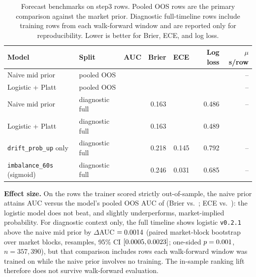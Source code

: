 \begin{table}[t]
  \centering
  \caption{Forecast benchmarks on step3 rows. Pooled OOS rows are the primary
    comparison against the market prior. Diagnostic full-timeline rows include
    training rows from each walk-forward window and are reported only for
    reproducibility. Lower is better for Brier, ECE, and log loss.}
  \label{tab:forecast-benchmarks}
  \footnotesize
  \setlength{\tabcolsep}{3pt}
  \begin{tabular}{@{}llrrrrr@{}}
    \toprule
    Model & Split & AUC & Brier & ECE & Log loss & $\mu$s/row \\
    \midrule
    Naive mid prior & pooled OOS & \OpenMarketNaiveOosAuc{} & \OpenMarketNaiveOosBrier{} & \OpenMarketNaiveOosEce{} & \OpenMarketNaiveOosLogLoss{} & -- \\
    Logistic + Platt & pooled OOS & \OpenMarketModelOosAuc{} & \OpenMarketModelOosBrier{} & \OpenMarketModelOosEce{} & \OpenMarketModelOosLogLoss{} & -- \\
    Naive mid prior & diagnostic full & \OpenMarketNaiveAuc{} & 0.163 & \OpenMarketNaiveEce{} & 0.486 & -- \\
    Logistic + Platt & diagnostic full & \OpenMarketLogisticAuc{} & 0.163 & \OpenMarketLogisticEce{} & 0.489 & \OpenMarketLogisticScoreUs{} \\
    \texttt{drift\_prob\_up} only & diagnostic full & \OpenMarketDriftAuc{} & 0.218 & 0.145 & 0.792 & -- \\
    \texttt{imbalance\_60s} (sigmoid) & diagnostic full & \OpenMarketImbalanceAuc{} & 0.246 & 0.031 & 0.685 & -- \\
    \bottomrule
  \end{tabular}
\end{table}

\textbf{Effect size.} On the \OpenMarketOosRows{} rows the trainer scored
strictly out-of-sample, the naive prior attains AUC
\OpenMarketNaiveOosAuc{} versus the model's pooled OOS AUC of
\OpenMarketModelOosAuc{} (Brier \OpenMarketNaiveOosBrier{} vs.\
\OpenMarketModelOosBrier{}; ECE \OpenMarketNaiveOosEce{} vs.\
\OpenMarketModelOosEce{}): the logistic model does not beat, and slightly
underperforms, market-implied probability. For diagnostic context only, the full
timeline shows logistic \texttt{v0.2.1} above the naive mid prior by
$\Delta$AUC $= 0.0014{}$ (paired market-block bootstrap over
\OpenMarketBootstrapBlocks{} market blocks, \OpenMarketBootstrapN{} resamples,
95\% CI $[0.0005{}, 0.0023{}]$; one-sided
$p=0.001{}$, $n=357{,}390$), but that comparison includes rows each
walk-forward window was trained on while the naive prior involves no training.
The in-sample ranking lift therefore does not survive walk-forward evaluation.

